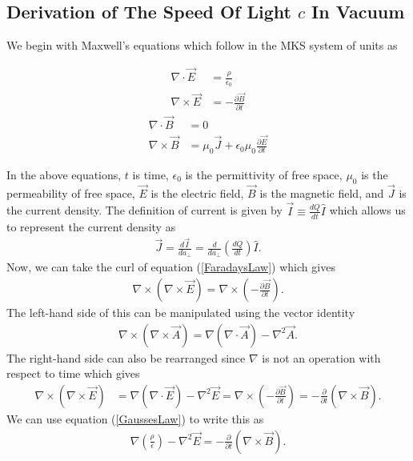 \subsection{Derivation of The Speed Of Light $c$ In Vacuum}


We begin with Maxwell's equations which follow in the MKS system of units \cite{bib:Wolfram} as
\begin{multicols}{2}
	\noindent
	\begin{align}
		\nabla \cdot \vec{E} &= \frac{\rho}{\epsilon_0} \label{GaussesLaw}\\
		\nabla \times \vec{E} &= -\frac{\partial \vec{B}}{\partial t} \label{FaradaysLaw}
	\end{align}
	\begin{align}
		\nabla \cdot \vec{B} &= 0 \\
		\nabla \times \vec{B} &= \mu_0\vec{J}+\epsilon_0\mu_0\frac{\partial \vec{E}}{\partial t} \label{AmperesLaw}
	\end{align}
\end{multicols}
In the above equations, $t$ is time, $\epsilon_0$ is the permittivity of free space, $\mu_0$ is the permeability of free space, $\vec{E}$ is the electric field, $\vec{B}$ is the magnetic field, and $\vec{J}$ is the current density.  The definition of current is given by $\vec{I} \equiv \frac{dQ}{dt}\hat{I}$ which allows us to represent the current density as
\begin{align}
	\vec{J} = \frac{d\vec{I}}{da_\perp} = \frac{d}{da_\perp}\left(\frac{dQ}{dt}\right)\hat{I}. \label{current density}
\end{align} 
Now, we can take the curl of equation (\ref{FaradaysLaw}) which gives
\begin{align}
	\nabla \times (\nabla \times \vec{E}) = \nabla \times \left(-\frac{\partial \vec{B}}{\partial t}\right).
\end{align}
The left-hand side of this can be manipulated using the vector identity
\begin{align}
	\nabla \times (\nabla \times \vec{A}) = \nabla (\nabla \cdot \vec{A})- \nabla^2\vec{A}.
\end{align} 
The right-hand side can also be rearranged since $\nabla$ is not an operation with respect to time which gives
\begin{align}
	\nabla \times (\nabla \times \vec{E}) &= \nabla (\nabla \cdot \vec{E})- \nabla^2\vec{E} = \nabla \times \left(-\frac{\partial \vec{B}}{\partial t}\right) = -\frac{\partial}{\partial t}(\nabla \times \vec{B}).
\end{align}
We can use equation (\ref{GaussesLaw}) to write this as
\begin{align}
	\nabla \left(\frac{\rho}{\epsilon}\right)- \nabla^2\vec{E} = -\frac{\partial}{\partial t}(\nabla \times \vec{B}). \label{derivationStep}
\end{align}


